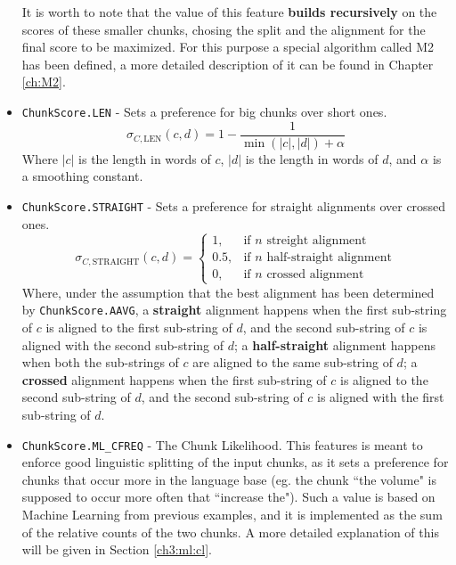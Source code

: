 \begin{itemize}
	It is worth to note that the value of this feature \textbf{builds recursively} on the scores of these smaller chunks, chosing the split and the alignment for the final score to be maximized. For this purpose a special algorithm called M2 has been defined, a more detailed description of it can be found in Chapter \ref{ch:M2}.
	
	\item \texttt{ChunkScore.LEN} - Sets a preference for big chunks over short ones.
	\begin{displaymath}
		\sigma_{C,\text{LEN}}(c,d) = 1-\frac{1}{\min(|c|,|d|)+\alpha}
	\end{displaymath}
	Where $|c|$ is the length in words of $c$, $|d|$ is the length in words of $d$, and $\alpha$ is a smoothing constant.
	
	\item \texttt{ChunkScore.STRAIGHT} - Sets a preference for straight alignments over crossed ones.
	\begin{displaymath}
		\sigma_{C,\text{STRAIGHT}}(c,d) = \begin{cases} 1, & \mbox{if } n\mbox{ streight alignment} \\
		                                                0.5, & \mbox{if } n\mbox{ half-straight alignment} \\
		                                                0, & \mbox{if } n\mbox{ crossed alignment} \end{cases}
	\end{displaymath}
	Where, under the assumption that the best alignment has been determined by \texttt{ChunkScore.AAVG}, a \textbf{straight} alignment happens when the first sub-string of $c$ is aligned to the first sub-string of $d$, and the second sub-string of $c$ is aligned with the second sub-string of $d$; a \textbf{half-straight} alignment happens when both the sub-strings of $c$ are aligned to the same sub-string of $d$; a \textbf{crossed} alignment happens when the first sub-string of $c$ is aligned to the second sub-string of $d$, and the second sub-string of $c$ is aligned with the first sub-string of $d$.

	\item \texttt{ChunkScore.ML\_CFREQ} - The Chunk Likelihood. This features is meant to enforce good linguistic splitting of the input chunks, as it sets a preference for chunks that occur more in the language base (eg. the chunk ``the volume" is supposed to occur more often that ``increase the"). Such a value is based on Machine Learning from previous examples, and it is implemented as the sum of the relative counts of the two chunks. A more detailed explanation of this will be given in Section \ref{ch3:ml:cl}.
	

\end{itemize}
